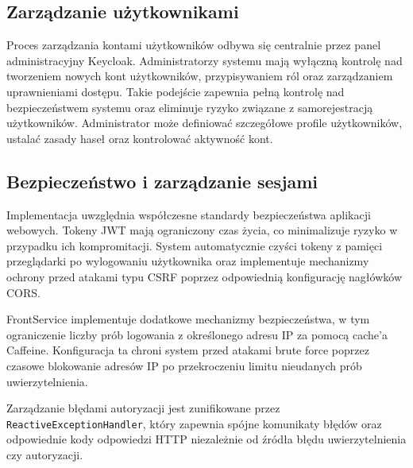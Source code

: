 \subsection{Zarządzanie użytkownikami}

Proces zarządzania kontami użytkowników odbywa się centralnie przez panel administracyjny Keycloak. Administratorzy systemu mają wyłączną kontrolę nad tworzeniem nowych kont użytkowników, przypisywaniem ról oraz zarządzaniem uprawnieniami dostępu. Takie podejście zapewnia pełną kontrolę nad bezpieczeństwem systemu oraz eliminuje ryzyko związane z samorejestracją użytkowników. Administrator może definiować szczegółowe profile użytkowników, ustalać zasady haseł oraz kontrolować aktywność kont. 

\subsection{Bezpieczeństwo i zarządzanie sesjami}

Implementacja uwzględnia współczesne standardy bezpieczeństwa aplikacji webowych. Tokeny JWT mają ograniczony czas życia, co minimalizuje ryzyko w przypadku ich kompromitacji. System automatycznie czyści tokeny z pamięci przeglądarki po wylogowaniu użytkownika oraz implementuje mechanizmy ochrony przed atakami typu CSRF poprzez odpowiednią konfigurację nagłówków CORS.

FrontService implementuje dodatkowe mechanizmy bezpieczeństwa, w tym ograniczenie liczby prób logowania z określonego adresu IP za pomocą cache'a Caffeine. Konfiguracja ta chroni system przed atakami brute force poprzez czasowe blokowanie adresów IP po przekroczeniu limitu nieudanych prób uwierzytelnienia.

Zarządzanie błędami autoryzacji jest zunifikowane przez \texttt{ReactiveExceptionHandler}, który zapewnia spójne komunikaty błędów oraz odpowiednie kody odpowiedzi HTTP niezależnie od źródła błędu uwierzytelnienia czy autoryzacji. 